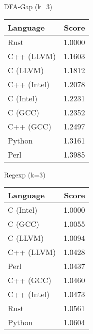 \begin{subtable}{0.33\textwidth}
    \centering
    \caption{DFA-Gap (k=3)}
    \label{table:energy:dfa_gap(3)}
    \begin{tabular}{|l|r|}
        \hline
        Language & Score \\
        \hline
        Rust & 1.0000 \\
        C++ (LLVM) & 1.1603 \\
        C (LLVM) & 1.1812 \\
        C++ (Intel) & 1.2078 \\
        C (Intel) & 1.2231 \\
        C (GCC) & 1.2352 \\
        C++ (GCC) & 1.2497 \\
        Python & 1.3161 \\
        Perl & 1.3985 \\
        \hline
    \end{tabular}
\end{subtable}%
\begin{subtable}{0.33\textwidth}
    \centering
    \caption{Regexp (k=3)}
    \label{table:energy:regexp(3)}
    \begin{tabular}{|l|r|}
        \hline
        Language & Score \\
        \hline
        C (Intel) & 1.0000 \\
        C (GCC) & 1.0055 \\
        C (LLVM) & 1.0094 \\
        C++ (LLVM) & 1.0428 \\
        Perl & 1.0437 \\
        C++ (GCC) & 1.0460 \\
        C++ (Intel) & 1.0473 \\
        Rust & 1.0561 \\
        Python & 1.0604 \\
        \hline
    \end{tabular}
\end{subtable}
